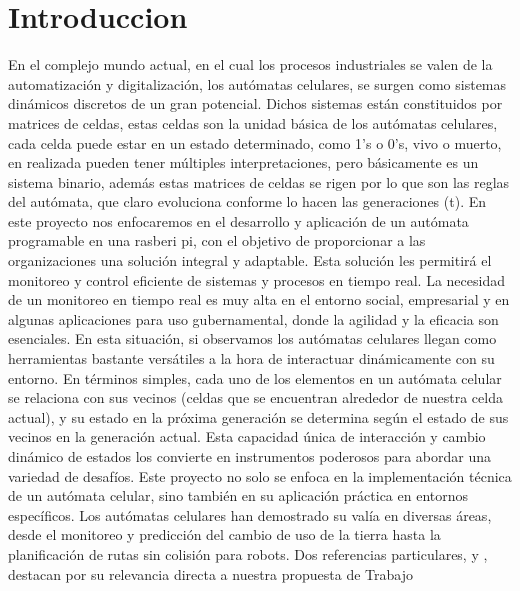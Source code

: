 \section{Introduccion}
\label{sec:introduccion}
    En el complejo mundo actual, en el cual los procesos industriales se valen de la automatizaci\'on y digitalizaci\'on,
        los aut\'omatas celulares, se surgen como sistemas din\'amicos discretos de un gran potencial. Dichos sistemas
        est\'an constituidos por matrices de celdas, estas celdas son la unidad b\'asica de los aut\'omatas celulares, cada
        celda puede estar en un estado determinado, como 1's o 0's, vivo o muerto, en realizada pueden tener m\'ultiples
        interpretaciones, pero b\'asicamente es un sistema binario, adem\'as estas matrices de celdas se rigen por lo que
        son las reglas del aut\'omata, que claro evoluciona conforme lo hacen las generaciones (t). En este proyecto nos
        enfocaremos en el desarrollo y aplicaci\'on de un aut\'omata programable en una rasberi pi, con el objetivo de
        proporcionar a las organizaciones una soluci\'on integral y adaptable. Esta soluci\'on les permitir\'a el monitoreo y
        control eficiente de sistemas y procesos en tiempo real.
    \vskip 0.5cm
    La necesidad de un monitoreo en tiempo real es muy alta en el entorno social, empresarial y en algunas
        aplicaciones para uso gubernamental, donde la agilidad y la eficacia son esenciales. En esta situaci\'on, si
        observamos los aut\'omatas celulares llegan como herramientas bastante vers\'atiles a la hora de interactuar
        din\'amicamente con su entorno. En t\'erminos simples, cada uno de los elementos en un aut\'omata celular se
        relaciona con sus vecinos (celdas que se encuentran alrededor de nuestra celda actual), y su estado en la pr\'oxima
        generaci\'on se determina seg\'un el estado de sus vecinos en la generaci\'on actual. Esta capacidad \'unica de
        interacci\'on y cambio din\'amico de estados los convierte en instrumentos poderosos para abordar una variedad
        de desaf\'ios.
    \vskip 0.5cm
    Este proyecto no solo se enfoca en la implementaci\'on t\'ecnica de un aut\'omata celular, sino tambi\'en en su
        aplicaci\'on pr\'actica en entornos espec\'ificos. Los aut\'omatas celulares han demostrado su val\'ia en diversas \'areas,
        desde el monitoreo y predicci\'on del cambio de uso de la tierra hasta la planificaci\'on de rutas sin colisi\'on para
        robots. Dos referencias particulares, \cite{Tzionas1997} y \cite{Lopes2023}, destacan por su relevancia directa a nuestra propuesta de Trabajo
